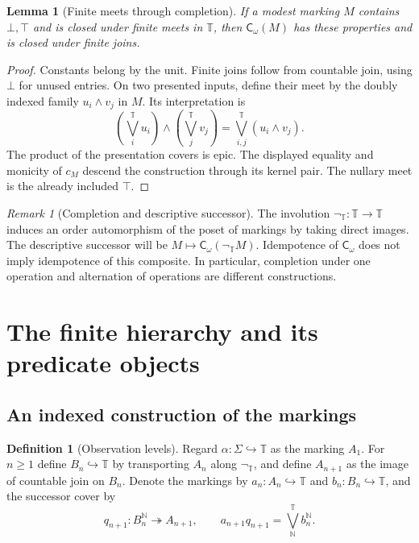 \documentclass[11pt,a4paper]{article}
\numberwithin{equation}{section}
\newtheorem{lemma}[lemma]{Lemma}
\theoremstyle{definition}
\newtheorem{definition}[definition]{Definition}
\theoremstyle{remark}
\newtheorem{remark}[remark]{Remark}
\theoremstyle{plain}
\newcommand{\N}{\mathbb N}
\newcommand{\TV}{\mathbb T}
\newcommand{\onto}{\twoheadrightarrow}
\newcommand{\incl}{\hookrightarrow}
\newcommand{\Cw}{\mathsf C_{\omega}}
\newcommand{\negT}{\neg_{\TV}}
\newcommand{\joinT}{\bigvee^{\TV}}
\begin{document}
\begin{lemma}[Finite meets through completion]
\label{lem:completion-meets}
If a modest marking $M$ contains $\bot,\top$ and is closed under finite
meets in $\TV$, then $\Cw(M)$ has these properties and is closed under
finite joins.
\end{lemma}
\begin{proof}
Constants belong by the unit. Finite joins follow from countable join,
using $\bot$ for unused entries. On two presented inputs, define their
meet by the doubly indexed family $u_i\wedge v_j$ in $M$. Its
interpretation is
\[
 \left(\joinT_i u_i\right)\wedge
 \left(\joinT_j v_j\right)=\joinT_{i,j}(u_i\wedge v_j).
\]
The product of the presentation covers is epic. The displayed equality
and monicity of $c_M$ descend the construction through its kernel pair.
The nullary meet is the already included $\top$.
\end{proof}

\begin{remark}[Completion and descriptive successor]
\label{rem:successor-not-reflection}
The involution $\negT:\TV\to\TV$ induces an order automorphism of
the poset of markings by taking direct images. The descriptive successor
will be $M\mapsto\Cw(\negT M)$. Idempotence of $\Cw$ does not imply
idempotence of this composite. In particular, completion under one
operation and alternation of operations are different constructions.
\end{remark}

\section{The finite hierarchy and its predicate objects}
\label{sec:hierarchy}

\subsection{An indexed construction of the markings}

\begin{definition}[Observation levels]
\label{def:observation-hierarchy}
Regard $\alpha:\Sigma\incl\TV$ as the marking $A_1$. For $n\geq1$
define $B_n\incl\TV$ by transporting $A_n$ along $\negT$, and define
$A_{n+1}$ as the image of countable join on $B_n$. Denote the markings
by $a_n:A_n\incl\TV$ and $b_n:B_n\incl\TV$, and the successor cover
by
\begin{equation}\label{eq:successor-cover}
 q_{n+1}:B_n^{\N}\onto A_{n+1},\qquad
 a_{n+1}q_{n+1}=\joinT_{\N}b_n^{\N}.
\end{equation}
\end{definition}
\end{document}
